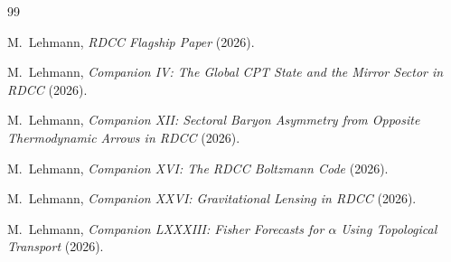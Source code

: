 \documentclass[11pt,a4paper]{article}
\begin{document}
\begin{thebibliography}{99}

M.~Lehmann,
\textit{RDCC Flagship Paper} (2026).

M.~Lehmann,
\textit{Companion IV: The Global CPT State and the Mirror Sector in RDCC} (2026).

M.~Lehmann,
\textit{Companion XII: Sectoral Baryon Asymmetry from Opposite Thermodynamic Arrows in RDCC} (2026).

M.~Lehmann,
\textit{Companion XVI: The RDCC Boltzmann Code} (2026).

M.~Lehmann,
\textit{Companion XXVI: Gravitational Lensing in RDCC} (2026).

M.~Lehmann,
\textit{Companion LXXXIII: Fisher Forecasts for $\alpha$ Using Topological Transport} (2026).

\end{thebibliography}
\end{document}
